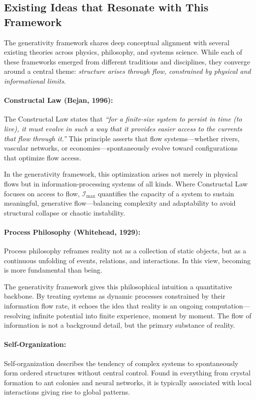 \documentclass[12pt]{article}
\begin{document}
\subsection{Existing Ideas that Resonate with This Framework}

The generativity framework shares deep conceptual alignment with several existing theories across physics, philosophy, and systems science. While each of these frameworks emerged from different traditions and disciplines, they converge around a central theme: \emph{structure arises through flow, constrained by physical and informational limits}.

\paragraph{Constructal Law (Bejan, 1996):}
The Constructal Law states that \textit{“for a finite-size system to persist in time (to live), it must evolve in such a way that it provides easier access to the currents that flow through it.”} This principle asserts that flow systems—whether rivers, vascular networks, or economies—spontaneously evolve toward configurations that optimize flow access.

In the generativity framework, this optimization arises not merely in physical flows but in information-processing systems of all kinds. Where Constructal Law focuses on access to flow, \(\mathcal{I}_{\text{max}}\) quantifies the capacity of a system to sustain meaningful, generative flow—balancing complexity and adaptability to avoid structural collapse or chaotic instability.

\paragraph{Process Philosophy (Whitehead, 1929):}
Process philosophy reframes reality not as a collection of static objects, but as a continuous unfolding of events, relations, and interactions. In this view, becoming is more fundamental than being.

The generativity framework gives this philosophical intuition a quantitative backbone. By treating systems as dynamic processes constrained by their information flow rate, it echoes the idea that reality is an ongoing computation—resolving infinite potential into finite experience, moment by moment. The flow of information is not a background detail, but the primary substance of reality.

\paragraph{Self-Organization:}
Self-organization describes the tendency of complex systems to spontaneously form ordered structures without central control. Found in everything from crystal formation to ant colonies and neural networks, it is typically associated with local interactions giving rise to global patterns.
\end{document}
